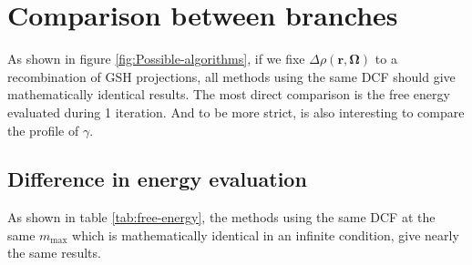 \section{Comparison between branches}

As shown in figure \ref{fig:Possible-algorithms}, if we fixe $\Delta\rho(\mathbf{r},\mathbf{\Omega})$
to a recombination of \acs{GSH} projections, all methods using the
same \acs{DCF} should give mathematically identical results. The
most direct comparison is the free energy evaluated during 1 iteration.
And to be more strict, is also interesting to compare the profile
of $\gamma$.

\subsection{Difference in energy evaluation}

As shown in table \ref{tab:free-energy}, the methods using the same
\acs{DCF} at the same $m_{\max}$ which is mathematically identical
in an infinite condition, give nearly the same results.

